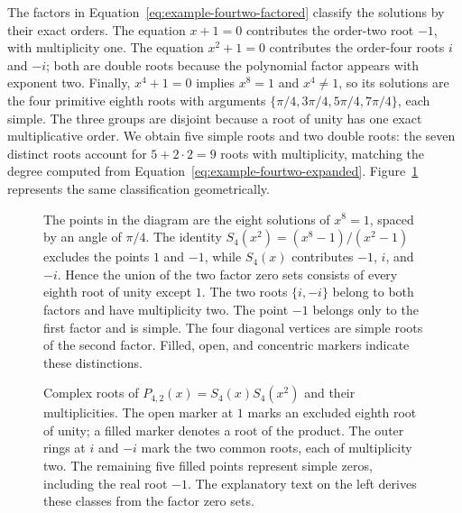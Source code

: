 \documentclass[11pt,a4paper]{article}
\numberwithin{equation}{section}
\theoremstyle{uprightpaper}
\begin{document}
The factors in Equation~\eqref{eq:example-fourtwo-factored} classify the solutions by their exact orders. The equation $x+1=0$ contributes the order-two root $-1$, with multiplicity one. The equation $x^2+1=0$ contributes the order-four roots $i$ and $-i$; both are double roots because the polynomial factor appears with exponent two. Finally, $x^4+1=0$ implies $x^8=1$ and $x^4\ne1$, so its solutions are the four primitive eighth roots with arguments $\{\pi/4,3\pi/4,5\pi/4,7\pi/4\}$, each simple. The three groups are disjoint because a root of unity has one exact multiplicative order. We obtain five simple roots and two double roots: the seven distinct roots account for $5+2\cdot2=9$ roots with multiplicity, matching the degree computed from Equation~\eqref{eq:example-fourtwo-expanded}. Figure~\ref{fig:fourtwo} represents the same classification geometrically.

\begin{figure}[H]
\centering
\begin{minipage}[c]{0.53\textwidth}
\small\setlength{\parindent}{1em}
The points in the diagram are the eight solutions of $x^8=1$, spaced by an angle of $\pi/4$. The identity $S_4(x^2)=(x^8-1)/(x^2-1)$ excludes the points $1$ and $-1$, while $S_4(x)$ contributes $-1$, $i$, and $-i$. Hence the union of the two factor zero sets consists of every eighth root of unity except $1$. The two roots $\{i,-i\}$ belong to both factors and have multiplicity two. The point $-1$ belongs only to the first factor and is simple. The four diagonal vertices are simple roots of the second factor. Filled, open, and concentric markers indicate these distinctions.
\end{minipage}\hfill
\begin{minipage}[c]{0.43\textwidth}
\centering
{}
\end{minipage}
\caption{Complex roots of $P_{4,2}(x)=S_4(x)S_4(x^2)$ and their multiplicities. The open marker at $1$ marks an excluded eighth root of unity; a filled marker denotes a root of the product. The outer rings at $i$ and $-i$ mark the two common roots, each of multiplicity two. The remaining five filled points represent simple zeros, including the real root $-1$. The explanatory text on the left derives these classes from the factor zero sets.}
\label{fig:fourtwo}
\end{figure}
\end{document}
